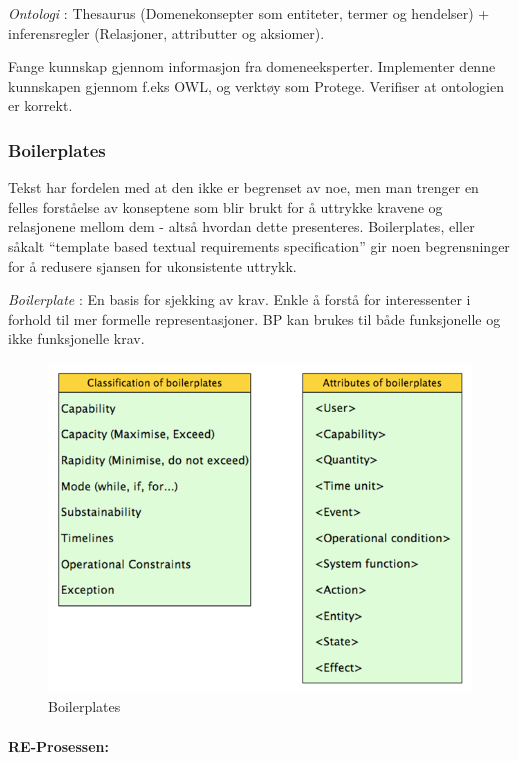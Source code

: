 \emph{Ontologi} : Thesaurus (Domenekonsepter som entiteter, termer og
hendelser) + inferensregler (Relasjoner, attributter og aksiomer).

Fange kunnskap gjennom informasjon fra domeneeksperter. Implementer
denne kunnskapen gjennom f.eks OWL, og verktøy som Protege. Verifiser at
ontologien er korrekt.

\subsubsection{Boilerplates}

Tekst har fordelen med at den ikke er begrenset av noe, men man trenger
en felles forståelse av konseptene som blir brukt for å uttrykke kravene
og relasjonene mellom dem - altså hvordan dette presenteres.
Boilerplates, eller såkalt ``template based textual requirements
specification'' gir noen begrensninger for å redusere sjansen for
ukonsistente uttrykk.

\emph{Boilerplate} : En basis for sjekking av krav. Enkle å forstå for
interessenter i forhold til mer formelle representasjoner. BP kan brukes
til både funksjonelle og ikke funksjonelle krav.

\begin{figure}[htbp]
\centering
\includegraphics{Forelesning 02/img/1.png}
\caption{Boilerplates}
\end{figure}

\paragraph{RE-Prosessen:}

